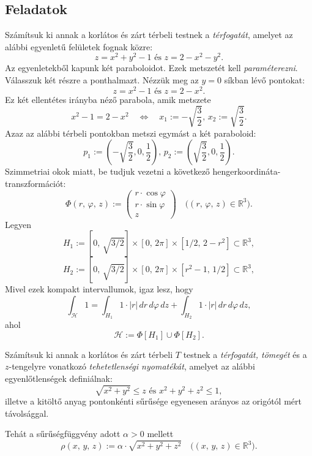\documentclass{article}
\newcommand{\R}{\mathbb{R}}
\begin{document}
	\subsection{Feladatok}
	Számítsuk ki annak a korlátos és zárt térbeli testnek a \textit{térfogatát}, amelyet az alábbi egyenletű felületek fognak közre:
	\[
		z = x^2 + y^2 -1 \text{ és } z = 2 - x^2 - y^2.
	\]
	Az egyenletekből kapunk két paraboloidot. Ezek metszetét kell \textit{paraméterezni}. Válasszuk két részre a ponthalmazt. Nézzük meg az $y = 0$ síkban lévő pontokat:
	\[
		z = x^2 - 1 \text{ és } z = 2 - x^2.
	\]
	Ez két ellentétes irányba néző parabola, amik metszete
	\[
		x^2 - 1 = 2 - x^2 \quad \Longleftrightarrow \quad x_1 := - \sqrt{\frac{3}{2}}, \, x_2 := \sqrt{\frac{3}{2}}.
	\]
	Azaz az alábbi térbeli pontokban metszi egymást a két paraboloid:
	\[
		p_1 := \left( - \sqrt{\frac{3}{2}}, 0, \frac{1}{2} \right), \, p_2 := \left( \sqrt{\frac{3}{2}}, 0, \frac{1}{2} \right).
	\]
	Szimmetriai okok miatt, be tudjuk vezetni a következő hengerkoordináta-transzformációt:
	\[
		\Phi(r, \, \varphi, \, z) := \begin{pmatrix}
			r \cdot \cos \varphi \\
			r \cdot \sin \varphi \\
			z
		\end{pmatrix} \quad \big( (r, \, \varphi, \, z) \in \R^3 \big).
	\]
	Legyen
	\[
		H_1 := [0, \, \sqrt{3 / 2}] \times [0, \, 2 \pi] \times [1/2, \, 2-r^2] \subset \R^3,
	\]
	\[
		H_2 := [0, \, \sqrt{3 / 2}] \times [0, \, 2 \pi] \times [r^2-1, \, 1/2] \subset \R^3,
	\]
	Mivel ezek kompakt intervallumok, igaz lesz, hogy
	\[
		\int_{\mathcal{H}} 1 = \int_{H_1} 1 \cdot |r| \, dr \, d\varphi \, dz + \int_{H_2} 1 \cdot |r| \, dr \, d\varphi \, dz, 
	\]
	ahol
	\[
		\mathcal{H} := \Phi[H_1] \cup \Phi[H_2].
	\]
	\newpage

	Számítsuk ki annak a korlátos és zárt térbeli $T$ testnek a \textit{térfogatát, tömegét} és a $z$-tengelyre vonatkozó \textit{tehetetlenségi nyomatékát}, amelyet az alábbi egyenlőtlenségek definiálnak:
	\[
		\sqrt{x^2 + y^2} \leq z \text{ és } x^2 + y^2 + z^2 \leq 1,
	\]
	illetve a kitöltő anyag pontonkénti sűrűsége egyenesen arányos az origótól mért távolsággal.

	Tehát a sűrűségfüggvény adott $\alpha > 0$ mellett
	\[
		\rho(x, \, y, \, z) := \alpha \cdot \sqrt{x^2 + y^2 + z^2} \quad \big( (x, \, y, \, z) \in \R^3\big).
	\]
\end{document}
